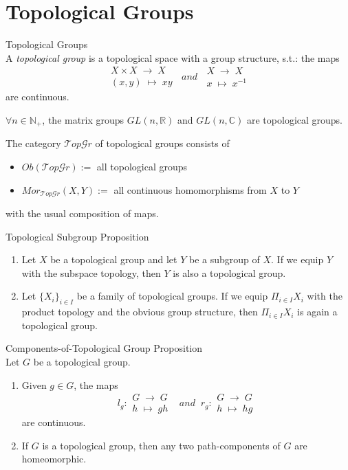 \section{Topological Groups}

\begin{definition}{Topological Groups}\\
A \textit{topological group} is a topological space with a group structure, s.t.: the maps
$$\substack{X \times X \;\to\; X\\
(x,y) \;\mapsto\; xy} \;\;and\;\; \substack{X \;\to\; X\\
x \;\mapsto\; x^{-1}}$$
are continuous.
\end{definition}

\begin{proposition}
    $\forall n \in \mathbb{N}_+$, the matrix groups $GL(n,\mathbb{R})$ and $GL(n,\mathbb{C})$ are topological groups.
\end{proposition}

\begin{definition}
    The category $\mathcal{T}op\mathcal{G}r$ of topological groups consists of 
    \begin{itemize}
        \item $Ob(\mathcal{T}op\mathcal{G}r) :=$ all topological groups
        \item $Mor_{\mathcal{T}op\mathcal{G}r} (X,Y) :=$ all continuous homomorphisms from $X$ to $Y$
    \end{itemize}
    with the usual composition of maps.
\end{definition}

\begin{proposition}{Topological Subgroup Proposition}\\
\begin{enumerate}
    \item Let $X$ be a topological group and let $Y$ be a subgroup of $X$. If we equip $Y$ with the subspace topology, then $Y$ is also a topological group.
    \item Let $\{X_i\}_{i \in I}$ be a family of topological groups. If we equip $\Pi_{i \in I} X_i$ with the product topology and the obvious group structure, then $\Pi_{i \in I}X_i$ is again a topological group.
\end{enumerate}
\end{proposition}

\begin{proposition}{Components-of-Topological Group Proposition}\\
Let $G$ be a topological group.
\begin{enumerate}
    \item Given $g \in G$, the maps
    $$l_g: \substack{G \;\to\; G\\
    h \;\mapsto\; gh} \:\;\;and\;\; r_g: \substack{G \;\to\;G\\
    h \;\mapsto\; hg}$$
    are continuous.

    \item If $G$ is a topological group, then any two path-components of $G$ are homeomorphic.
\end{enumerate}
\end{proposition}

